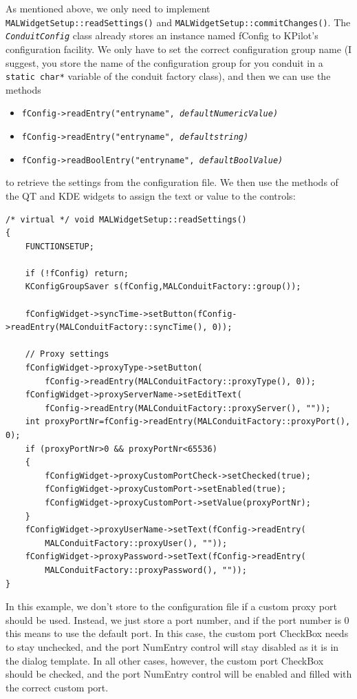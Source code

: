 \documentclass[10pt,a4paper]{article}
\newcommand{\code}[1]{{\small\texttt{#1}}}
\newcommand{\class}[1]{{\small\em\texttt{#1}}}
\begin{document}
As mentioned above, we only need to implement \code{MALWidgetSetup::readSettings()} 
and \code{MALWidgetSetup::commitChanges()}. The \class{ConduitConfig} class 
already stores an instance named fConfig to KPilot's configuration facility. 
We only have to set the correct configuration group name (I suggest, you 
store the name of the configuration group for you conduit in a \code{static 
char*} variable of the conduit factory class), and then we can use the methods
\begin{itemize}
\item \code{fConfig->readEntry("entryname", \em{defaultNumericValue})}
\item \code{fConfig->readEntry("entryname", \em{defaultstring})}
\item \code{fConfig->readBoolEntry("entryname", \em{defaultBoolValue})}
\end{itemize}
to retrieve the settings from the configuration file. We then use the methods of the QT and KDE widgets to assign the text or value to the controls:

{\footnotesize\begin{verbatim}
/* virtual */ void MALWidgetSetup::readSettings()
{
    FUNCTIONSETUP;

    if (!fConfig) return;
    KConfigGroupSaver s(fConfig,MALConduitFactory::group());
    
    fConfigWidget->syncTime->setButton(fConfig->readEntry(MALConduitFactory::syncTime(), 0));
    
    // Proxy settings
    fConfigWidget->proxyType->setButton(
        fConfig->readEntry(MALConduitFactory::proxyType(), 0));
    fConfigWidget->proxyServerName->setEditText(
        fConfig->readEntry(MALConduitFactory::proxyServer(), ""));
    int proxyPortNr=fConfig->readEntry(MALConduitFactory::proxyPort(), 0);
    if (proxyPortNr>0 && proxyPortNr<65536) 
    {
        fConfigWidget->proxyCustomPortCheck->setChecked(true);
        fConfigWidget->proxyCustomPort->setEnabled(true);
        fConfigWidget->proxyCustomPort->setValue(proxyPortNr);
    }
    fConfigWidget->proxyUserName->setText(fConfig->readEntry(
        MALConduitFactory::proxyUser(), ""));
    fConfigWidget->proxyPassword->setText(fConfig->readEntry(
        MALConduitFactory::proxyPassword(), ""));
}
\end{verbatim}
}

In this example, we don't store to the configuration file if a custom proxy port should be used. Instead, we just store a port number, and if the port number is 0 this means to use the default port. In this case, the custom port CheckBox needs to stay unchecked, and the port NumEntry control will stay disabled as it is in the dialog template. In all other cases, however, the custom port CheckBox should be checked, and the port NumEntry control will be enabled and filled with the correct custom port.
\end{document}
